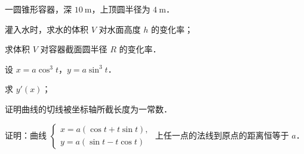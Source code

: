 \begin{xiti}
\item 一圆锥形容器，深 $10\ \mathrm{m}$，上顶圆半径为 $4\ \mathrm{m}$．
\begin{ziti}
\item 灌入水时，求水的体积 $V$ 对水面高度 $h$ 的变化率；
\item 求体积 $V$ 对容器截面圆半径 $R$ 的变化率．
\end{ziti}

\item 设 $x=a\cos^{3}t$，$y=a\sin^{3}t$．
\begin{ziti}
\item 求 $y'(x)$；
\item 证明曲线的切线被坐标轴所截长度为一常数．
\end{ziti}

\item 证明：曲线 $\begin{cases} x=a(\cos t+t\sin t),\\ y=a(\sin t-t\cos t)\end{cases}$ 上任一点的法线到原点的距离恒等于 $a$．
\end{xiti}
